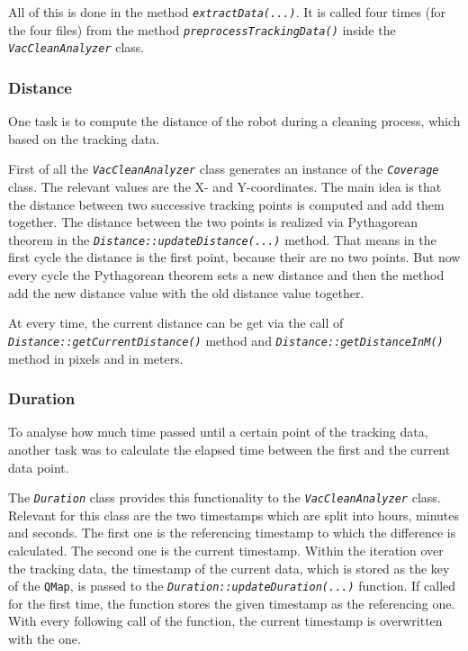 \documentclass[twoside]{article}
\begin{document}
All of this is done in the method \textit{\texttt{extractData(...)}}. It is called four times (for the four files) from the method \textit{\texttt{preprocessTrackingData()}} inside the \textit{\texttt{VacCleanAnalyzer}} class.

\subsubsection{Distance} %
One task is to compute the distance of the robot during a cleaning process, which based on the tracking data.

First of all the \textit{\texttt{VacCleanAnalyzer}} class generates an instance of the \textit{\texttt{Coverage}} class. The relevant values are the X- and Y-coordinates. The main idea is that the distance between two successive tracking points is computed and add them together. The distance between the two points is realized via Pythagorean theorem in the \textit{\texttt{Distance::updateDistance(...)}} method. That means in the first cycle the distance is the first point, because their are no two points. But now every cycle the Pythagorean theorem sets a new distance and then the method add the new distance value with the old distance value together.


At every time, the current distance can be get via the call of \textit{\texttt{Distance::getCurrentDistance()}} method and \textit{\texttt{Distance::getDistanceInM()}} method in pixels and in meters.

\subsubsection{Duration} %
To analyse how much time passed until a certain point of the tracking data, another task was to calculate the elapsed time between the first and the current data point.

The \textit{\texttt{Duration}} class provides this functionality to the \textit{\texttt{VacCleanAnalyzer}} class. 
Relevant for this class are the two timestamps which are split into hours, minutes and seconds. The first one is the referencing timestamp to which the difference is calculated. The second one is the current timestamp.
Within the iteration over the tracking data, the timestamp of the current data, which is stored as the key of the \texttt{QMap}, is passed to the \textit{\texttt{Duration::updateDuration(...)}} function. If called for the first time, the function stores the given timestamp as the referencing one. With every following call of the function, the current timestamp is overwritten with the one.
\end{document}
